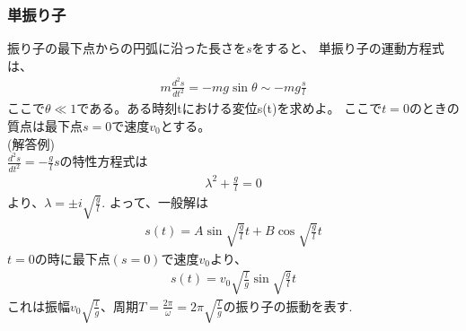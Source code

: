 \documentclass[a4paper,11pt,fleqn]{jarticle}
\begin{document}
\subsubsection{単振り子}
振り子の最下点からの円弧に沿った長さを$s$をすると、
単振り子の運動方程式は、
\begin{eqnarray*}
m\frac{d^2s}{dt^2}=-mg\sin\theta\sim-mg\frac{s}{l}
\end{eqnarray*}
ここで$\theta\ll1$である。ある時刻tにおける変位s(t)を求めよ。
ここで$t=0$のときの質点は最下点$s=0$で速度$v_0$とする。\\
(解答例)\\
$\frac{d^2s}{dt^2}=-\frac{g}{l}s$の特性方程式は
\begin{eqnarray*}
\lambda^2+\frac{g}{l}=0
\end{eqnarray*}
より、$\lambda=\pm{i}\sqrt{\frac{g}{l}}$. よって、一般解は
\begin{eqnarray*}
s(t)=A\sin{\sqrt{\frac{g}{l}}t}+B\cos{\sqrt{\frac{g}{l}}t}
\end{eqnarray*}
$t=0$の時に最下点$(s=0)$で速度$v_0$より、
\begin{eqnarray*}
s(t)=v_0\sqrt{\frac{l}{g}}\sin{\sqrt{\frac{g}{l}}t}
\end{eqnarray*}
これは振幅$v_0\sqrt{\frac{l}{g}}$、周期$T=\frac{2\pi}{\omega}=2\pi\sqrt{\frac{l}{g}}$の振り子の振動を表す.\\

\newpage
\end{document}
